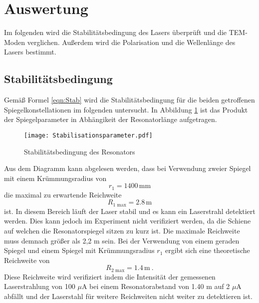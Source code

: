 \section{Auswertung}
\label{sec:Auswertung}
Im folgenden wird die Stabilitätsbedingung des Lasers überprüft und die TEM-Moden verglichen. Außerdem wird die Polarisation und die Wellenlänge des Lasers bestimmt.

\subsection{Stabilitätsbedingung}
Gemäß Formel \ref{eqn:Stab} wird die Stabilitätsbedingung für die beiden getroffenen Spiegelkonstellationen im folgenden untersucht. In Abbildung \ref{fig:stabi} ist das Produkt der Spiegelparameter in Abhängikeit der Resonatorlänge aufgetragen.
\begin{figure}
  \centering
  \texttt{[image: Stabilisationsparameter.pdf]}
  \caption{Stabilitätsbedingung des Resonators}
  \label{fig:stabi}
\end{figure}
Aus dem Diagramm kann abgelesen werden, dass bei Verwendung zweier Spiegel mit einem Krümmungsradius von
\begin{equation}
  r_1 = 1400 \, \text{mm}
  \label{eqn:rad1}
\end{equation}
die maximal zu erwartende Reichweite
\begin{equation}
  R_\text{1 max} = 2.8 \, \text{m}
  \label{eqn:rmax1}
\end{equation}
ist. In diesem Bereich läuft der Laser stabil und es kann ein Laserstrahl detektiert werden. Dies kann jedoch im Experiment nicht verifiziert werden, da die Schiene auf welchen die Resonatorspiegel sitzen zu kurz ist. Die maximale Reichweite muss demnach größer als 2,2 m sein. Bei der Verwendung von einem geraden Spiegel und einem Spiegel mit Krümmungsradius $r_1$ ergibt sich eine theoretische Reichweite von
\begin{equation}
  R_\text{2 max} = 1.4 \, \text{m} \ .
  \label{eqn:rmax2}
\end{equation}
Diese Reichweite wird verifiziert indem die Intensität der gemessenen Laserstrahlung von 100 $\mu$A bei einem Resonatorabstand von 1.40 m auf 2 $\mu$A abfällt und der Laserstahl für weitere Reichweiten nicht weiter zu detektieren ist.

